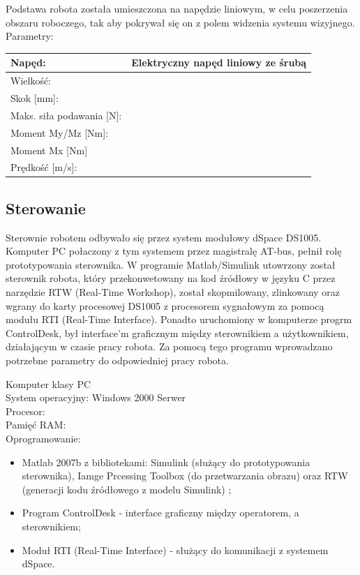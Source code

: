 \vspace{5mm}

Podstawa robota została umieszczona na napędzie liniowym, w celu poszerzenia obszaru roboczego, tak aby pokrywał się on z polem widzenia systemu wizyjnego.\\
Parametry:\\
\begin{tabular}{|l|l|}\hline
Napęd: & Elektryczny napęd liniowy ze śrubą \\ \hline
Wielkość: & \\ \hline
Skok [mm]: & \\ \hline
Maks. siła podawania [N]: & \\ \hline
Moment My/Mz [Nm]: & \\ \hline
Moment Mx [Nm] & \\ \hline
Prędkość [m/s]: & \\ \hline
\end{tabular}
\subsection{Sterowanie}
Sterownie robotem odbywało się przez system modułowy dSpace DS1005. Komputer PC połaczony z tym systemem przez magistralę AT-bus, pełnił rolę prototypowania sterownika. W programie Matlab/Simulink utowrzony został sterownik robota, który przekonwetowany na kod źródłowy w języku C przez narzędzie RTW (Real-Time Workshop), został skopmilowany, zlinkowany oraz wgrany do karty procesowej DS1005 z procesorem sygnałowym za pomocą modułu RTI (Real-Time Interface). Ponadto uruchomiony w komputerze progrm ControlDesk, był interface'm graficznym  między sterownikiem a użytkownikiem, działającym w czasie pracy robota. Za pomocą tego programu wprowadzano potrzebne parametry do odpowiedniej pracy robota.


\noindent 
Komputer klasy PC\\
System operacyjny: Windows 2000 Serwer\\
Procesor:\\
Pamięć RAM:\\

\noindent Oprogramowanie:
\begin{itemize}
\item Matlab 2007b z bibliotekami: Simulink (służący do prototypowania sterownika), Iamge Prcessing Toolbox (do przetwarzania obrazu) oraz RTW (generacji kodu źródłowego z modelu Simulink) ;
\item Program ControlDesk - interface graficzny między operatorem, a sterownikiem;
\item Moduł RTI (Real-Time Interface) - służący do komunikacji z systemem dSpace.
\end{itemize}

